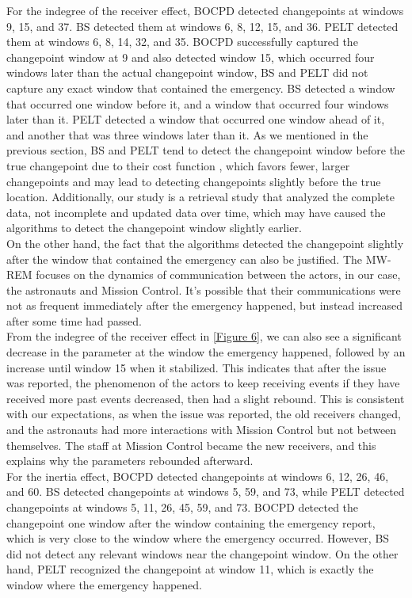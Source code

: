 \documentclass[]{interact}
\theoremstyle{plain}%
\theoremstyle{definition}
\theoremstyle{remark}
\begin{document}
{	For the indegree of the receiver effect, BOCPD detected changepoints at windows 9, 15, and 37. BS detected them at windows 6, 8, 12, 15, and 36. PELT detected them at windows 6, 8, 14, 32, and 35. BOCPD successfully captured the changepoint window at 9 and also detected window 15, which occurred four windows later than the actual changepoint window, BS and PELT did not capture any exact window that contained the emergency. BS detected a window that occurred one window before it, and a window that occurred four windows later than it. PELT detected a window that occurred one window ahead of it, and another that was three windows later than it. As we mentioned in the previous section, BS and PELT tend to detect the changepoint window before the true changepoint due to their cost function \cite{killickOptimalDetectionChangepoints2012}, which favors fewer, larger changepoints and may lead to detecting changepoints slightly before the true location. Additionally, our study is a retrieval study that analyzed the complete data, not incomplete and updated data over time, which may have caused the algorithms to detect the changepoint window slightly earlier. \\
	
	On the other hand, the fact that the algorithms detected the changepoint slightly after the window that contained the emergency can also be justified. The MW-REM focuses on the dynamics of communication between the actors, in our case, the astronauts and Mission Control. It's possible that their communications were not as frequent immediately after the emergency happened, but instead increased after some time had passed. \\
	
	From the indegree of the receiver effect in \autoref{Figure 6}, we can also see a significant decrease in the parameter at the window the emergency happened, followed by an increase until window 15 when it stabilized. This indicates that after the issue was reported, the phenomenon of the actors to keep receiving events if they have received more past events decreased, then had a slight rebound. This is consistent with our expectations, as when the issue was reported, the old receivers changed, and the astronauts had more interactions with Mission Control but not between themselves. The staff at Mission Control became the new receivers, and this explains why the parameters rebounded afterward. \\
	
	For the inertia effect, BOCPD detected changepoints at windows 6, 12, 26, 46, and 60. BS detected changepoints at windows 5, 59, and 73, while PELT detected changepoints at windows 5, 11, 26, 45, 59, and 73. BOCPD detected the changepoint one window after the window containing the emergency report, which is very close to the window where the emergency occurred. However, BS did not detect any relevant windows near the changepoint window. On the other hand, PELT recognized the changepoint at window 11, which is exactly the window where the emergency happened. \\
	 
}
\end{document}
